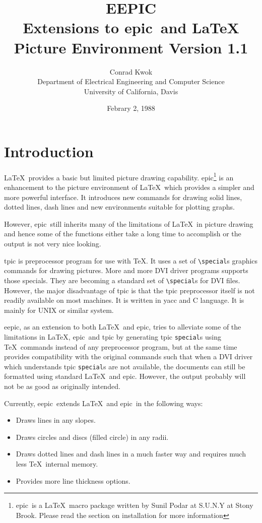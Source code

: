 \documentclass[11pt]{article}
\title{EEPIC\\Extensions to epic\ and \LaTeX \\ Picture
Environment Version 1.1}
\author{Conrad Kwok\\
  Department of Electrical Engineering and Computer Science\\
  University of California, Davis}
\date{Febrary 2, 1988}
\newcommand{\epic}{{\sc epic}}
\newcommand{\eepic}{{\sc eepic}}
\begin{document}
\maketitle


\section{Introduction}
\LaTeX\ provides a basic but limited picture drawing capability.
\epic\footnote{\epic\ is a \LaTeX\ macro package written by Sunil
Podar at S.U.N.Y at Stony Brook. Please read the section on
installation for more information} is an enhancement to the
picture environment of \LaTeX\ which provides a simpler and more
powerful interface. It introduces new commands for drawing solid
lines, dotted lines, dash lines and new environments suitable for
plotting graphs.

However, \epic\ still inherits many of the limitations of
\LaTeX\ in picture drawing and hence some of the functions either
take a long time to accomplish or the output is not very nice
looking.

tpic is preprocessor program for use with \TeX. It uses a set of
\verb|\special|s graphics commands for drawing pictures. More and
more DVI driver programs supports those specials. They are
becoming a standard set of \verb|\special|s for DVI files.
However, the major disadvantage of tpic is that the tpic
preprocessor itself is not readily available on most machines. It
is written in yacc and C language. It is mainly for UNIX or
similar system.

\eepic, as an extension to both \LaTeX\ and \epic, tries to
alleviate some of the limitations in \LaTeX, \epic\ and tpic by
generating tpic \verb|special|s using \TeX\ commands instead of
any preprocessor program, but at the same time provides
compatibility with the original commands such that when a DVI
driver which understands tpic \verb|special|s are not available,
the documents can still be formatted using standard \LaTeX\ and
\epic. However, the output probably will not be as good as
originally intended.

Currently, \eepic\ extends \LaTeX\ and \epic\ in the following
ways:
\begin{itemize}\parskip=0pt
\item Draws lines in any slopes.
\item Draws circles and discs (filled circle) in any radii.
\item Draws dotted lines and dash lines in a much faster way and
requires much less \TeX\ internal memory.
\item Provides more line thickness options.
\end{itemize}
\end{document}
